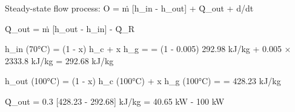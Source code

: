 Steady-state flow process:  
O = ṁ [h_in - h_out] + Q̇_out + d/dt  

Q̇_out = ṁ [h_out - h_in] - Q̇_R  

h_in (70°C) = (1 - x) h_c + x h_g =  
= (1 - 0.005) 292.98 kJ/kg + 0.005 × 2333.8 kJ/kg  
= 292.68 kJ/kg  

h_out (100°C) = (1 - x) h_c (100°C) + x h_g (100°C) =  
= 428.23 kJ/kg  

Q̇_out = 0.3 [428.23 - 292.68] kJ/kg  
= 40.65 kW - 100 kW